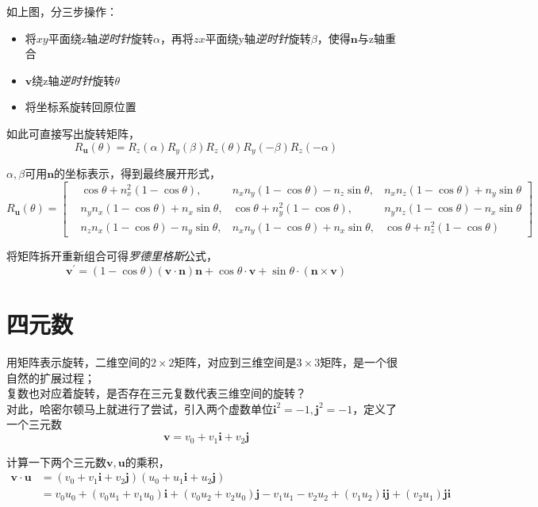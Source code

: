 \documentclass[hpyerref,UTF8,a4paper,titlepage,12pt,oneside]{ctexbook}
\theoremstyle{definition}
\begin{document}
如上图，分三步操作：
\begin{itemize}
	\item 将$xy$平面绕z轴\textit{逆时针}旋转$\alpha$，再将$zx$平面绕y轴\textit{逆时针}旋转$\beta$，使得$\mathbf{n}$与z轴重合
	\item $\mathbf{v}$绕z轴\textit{逆时针}旋转$\theta$
	\item 将坐标系旋转回原位置
\end{itemize}

如此可直接写出旋转矩阵，
$$
	R_{\mathbf{u}}(\theta) = R_z(\alpha)R_y(\beta)R_z(\theta)R_y(-\beta)R_z(-\alpha)
$$

$\alpha,\beta$可用$\mathbf{n}$的坐标表示，得到最终展开形式，
$$
	R_{\mathbf{u}}(\theta) = \begin{bmatrix}
	&\cos \theta +n_x^2(1-\cos\theta), &n_xn_y(1-\cos\theta)-n_z\sin\theta,&n_xn_z(1-\cos\theta) +n_y\sin\theta\\
	&n_yn_x(1-\cos\theta) + n_x\sin\theta, &\cos\theta + n_y^2(1-\cos\theta),&n_yn_z(1-\cos\theta) - n_x\sin\theta\\
	&n_zn_x(1-\cos\theta) -n_y\sin\theta, &n_xn_y(1-\cos\theta) +n_x\sin\theta,&\cos\theta+n_z^2(1-\cos\theta)
	\end{bmatrix}
$$

将矩阵拆开重新组合可得\textit{罗德里格斯}公式，
\begin{equation}\label{rodrigues}
	\mathbf{v}^\prime = (1-\cos\theta)(\mathbf{v}\cdot\mathbf{n})\mathbf{n} + \cos\theta\cdot\mathbf{v} + \sin\theta\cdot(\mathbf{n}\times \mathbf{v})
\end{equation}

\section{四元数}
用矩阵表示旋转，二维空间的$2\times 2$矩阵，对应到三维空间是$3\times 3$矩阵，是一个很自然的扩展过程；\\

复数也对应着旋转，是否存在三元复数代表三维空间的旋转？\\

对此，哈密尔顿马上就进行了尝试，引入两个虚数单位$\mathbf{i}^2 = -1,\mathbf{j}^2 = -1$，定义了一个三元数
$$
	\mathbf{v} = v_0 + v_1 \mathbf{i} +v_2 \mathbf{j}
$$

计算一下两个三元数$\mathbf{v},\mathbf{u}$的乘积，
\begin{align*}
	\mathbf{v}\cdot\mathbf{u} 
		&= (v_0 + v_1 \mathbf{i} +v_2 \mathbf{j})(u_0 + u_1 \mathbf{i} +u_2 \mathbf{j}) \\
		&= v_0u_0 + (v_0u_1 + v_1u_0)\mathbf{i} +(v_0u_2 +v_2u_0)\mathbf{j} -v_1u_1 -v_2u_2 + (v_1u_2)\mathbf{i}\mathbf{j} + (v_2u_1)\mathbf{j}\mathbf{i}
\end{align*}
\end{document}
